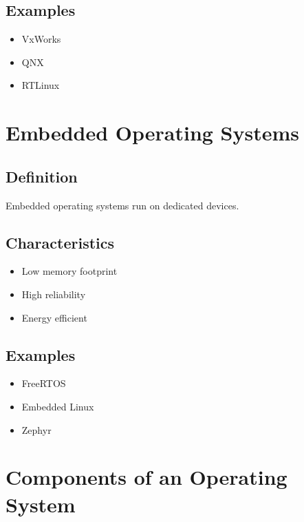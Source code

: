 \subsection{Examples}

\begin{itemize}
\item VxWorks
\item QNX
\item RTLinux
\end{itemize}

\section{Embedded Operating Systems}

\subsection{Definition}

Embedded operating systems run on dedicated devices.

\subsection{Characteristics}

\begin{itemize}
\item Low memory footprint
\item High reliability
\item Energy efficient
\end{itemize}

\subsection{Examples}

\begin{itemize}
\item FreeRTOS
\item Embedded Linux
\item Zephyr
\end{itemize}

\section{Components of an Operating System}

